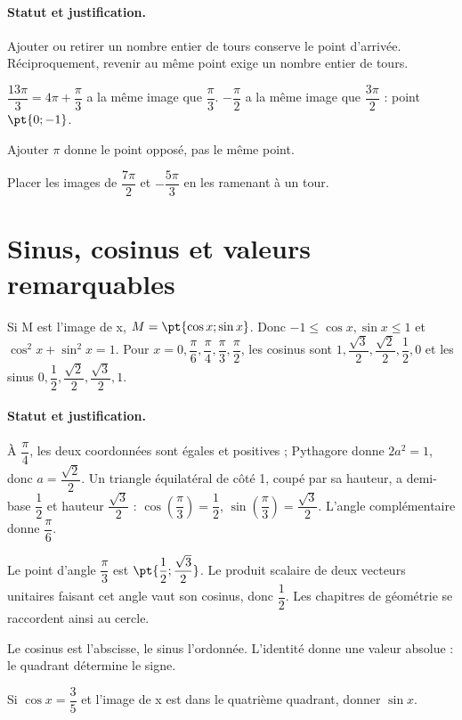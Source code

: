 \paragraph{Statut et justification.} Ajouter ou retirer un nombre entier de tours conserve le point d’arrivée. Réciproquement, revenir au même point exige un nombre entier de tours.
\begin{example}$\dfrac{13\pi}{3}=4\pi +\dfrac{\pi}{3}$ a la même image que $\dfrac{\pi}{3}$. $-\dfrac{\pi}{2}$ a la même image que $\dfrac{3\pi}{2}$ : point $\pt{0;-1}$.\end{example}\label{C10-EX2}
\begin{pitfall}Ajouter $\pi$ donne le point opposé, pas le même point.\end{pitfall}
\begin{application}Placer les images de $\dfrac{7\pi}{2}$ et $-\dfrac{5\pi}{3}$ en les ramenant à un tour.\end{application}\label{C10-AP2}
\section{Sinus, cosinus et valeurs remarquables}\label{C10-U3}
\begin{keypoint}
Si M est l’image de x, $M=\pt{\cos x;\sin x}$. Donc $-1\leq\cos x,\sin x\leq1$ et $\cos^2x+\sin^2x=1$. Pour $x=0,\dfrac{\pi}{6},\dfrac{\pi}{4},\dfrac{\pi}{3},\dfrac{\pi}{2}$, les cosinus sont $1,\dfrac{\sqrt 3}{2},\dfrac{\sqrt 2}{2},\dfrac{1}{2},0$ et les sinus $0,\dfrac{1}{2},\dfrac{\sqrt 2}{2},\dfrac{\sqrt 3}{2},1$.
\end{keypoint}
\paragraph{Statut et justification.} À $\dfrac{\pi}{4}$, les deux coordonnées sont égales et positives ; Pythagore donne $2a^2=1$, donc $a=\dfrac{\sqrt 2}{2}$. Un triangle équilatéral de côté 1, coupé par sa hauteur, a demi-base $\dfrac{1}{2}$ et hauteur $\dfrac{\sqrt 3}{2}$ : $\cos (\dfrac{\pi}{3})=\dfrac{1}{2}$, $\sin (\dfrac{\pi}{3})=\dfrac{\sqrt 3}{2}$. L’angle complémentaire donne $\dfrac{\pi}{6}$.
\begin{example}Le point d’angle $\dfrac{\pi}{3}$ est $\pt{\dfrac{1}{2};\dfrac{\sqrt 3}{2}}$. Le produit scalaire de deux vecteurs unitaires faisant cet angle vaut son cosinus, donc $\dfrac{1}{2}$. Les chapitres de géométrie se raccordent ainsi au cercle.\end{example}\label{C10-EX3}
\begin{pitfall}Le cosinus est l’abscisse, le sinus l’ordonnée. L’identité donne une valeur absolue : le quadrant détermine le signe.\end{pitfall}
\begin{application}Si $\cos x=\dfrac{3}{5}$ et l’image de x est dans le quatrième quadrant, donner $\sin x$.\end{application}\label{C10-AP3}
